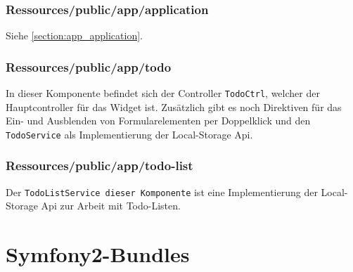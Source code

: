 \subsubsection{Ressources/public/app/application}
Siehe \ref{section:app_application}.

\subsubsection{Ressources/public/app/todo}
In dieser Komponente befindet sich der Controller \texttt{TodoCtrl}, welcher der Hauptcontroller für das Widget ist. Zusätzlich gibt es noch Direktiven für das Ein- und Ausblenden von Formularelementen per Doppelklick und den \texttt{TodoService} als Implementierung der Local-Storage Api.

\subsubsection{Ressources/public/app/todo-list}
Der \texttt{TodoListService dieser Komponente} ist eine Implementierung der Local-Storage Api zur Arbeit mit Todo-Listen.


\section{Symfony2-Bundles}

